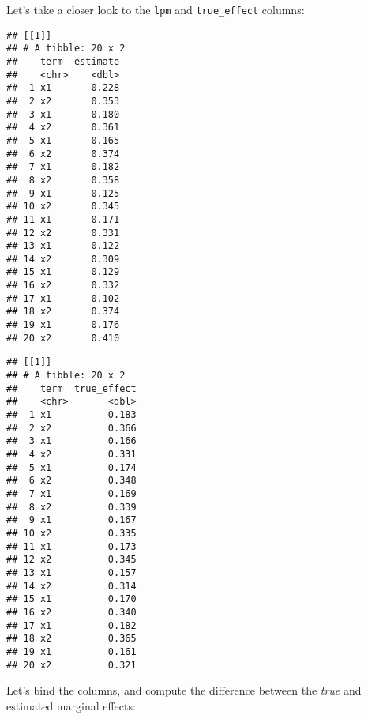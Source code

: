 \documentclass[
]{article}
\newenvironment{Shaded}{\begin{snugshade}}{\end{snugshade}}
\newcommand{\NormalTok}[1]{#1}
\newcommand{\OperatorTok}[1]{\textcolor[rgb]{0.81,0.36,0.00}{\textbf{#1}}}
\begin{document}
Let's take a closer look to the \texttt{lpm} and \texttt{true\_effect} columns:

\begin{Shaded}
\end{Shaded}

\begin{verbatim}
## [[1]]
## # A tibble: 20 x 2
##    term  estimate
##    <chr>    <dbl>
##  1 x1       0.228
##  2 x2       0.353
##  3 x1       0.180
##  4 x2       0.361
##  5 x1       0.165
##  6 x2       0.374
##  7 x1       0.182
##  8 x2       0.358
##  9 x1       0.125
## 10 x2       0.345
## 11 x1       0.171
## 12 x2       0.331
## 13 x1       0.122
## 14 x2       0.309
## 15 x1       0.129
## 16 x2       0.332
## 17 x1       0.102
## 18 x2       0.374
## 19 x1       0.176
## 20 x2       0.410
\end{verbatim}

\begin{Shaded}
\end{Shaded}

\begin{verbatim}
## [[1]]
## # A tibble: 20 x 2
##    term  true_effect
##    <chr>       <dbl>
##  1 x1          0.183
##  2 x2          0.366
##  3 x1          0.166
##  4 x2          0.331
##  5 x1          0.174
##  6 x2          0.348
##  7 x1          0.169
##  8 x2          0.339
##  9 x1          0.167
## 10 x2          0.335
## 11 x1          0.173
## 12 x2          0.345
## 13 x1          0.157
## 14 x2          0.314
## 15 x1          0.170
## 16 x2          0.340
## 17 x1          0.182
## 18 x2          0.365
## 19 x1          0.161
## 20 x2          0.321
\end{verbatim}

Let's bind the columns, and compute the difference between the \emph{true} and estimated marginal
effects:
\end{document}
